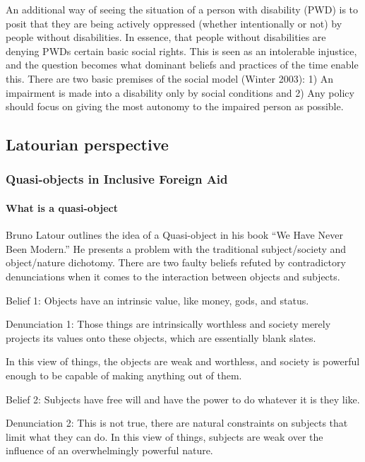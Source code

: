 \documentclass[a4paper]{article}
\begin{document}
An additional way of seeing the situation of a person with disability (PWD) is
to posit that they are being actively oppressed (whether intentionally or not)
by people without disabilities. In essence, that people without disabilities
are denying PWDs certain basic social rights. This is seen as an intolerable
injustice, and the question becomes what dominant beliefs and practices of the
time enable this. There are two basic premises of the social model (Winter
2003): 1) An impairment is made into a disability only by social conditions
and 2) Any policy should focus on giving the most autonomy to the impaired
person as possible.  



\subsection{Latourian perspective}


\subsubsection{Quasi-objects in Inclusive Foreign Aid}

\paragraph{What is a quasi-object}

Bruno Latour outlines the idea of a Quasi-object in his book ``We Have Never
Been Modern.'' He presents a problem with the traditional subject/society and
object/nature dichotomy. There are two faulty beliefs refuted by contradictory
denunciations when it comes to the interaction between objects and subjects. 

Belief 1: Objects have an intrinsic value, like money, gods, and status. 

Denunciation 1: Those things are intrinsically worthless and society merely
projects its values onto these objects, which are essentially blank slates.

In this view of things, the objects are weak and worthless, and society is
powerful enough to be capable of making anything out of them.

Belief 2: Subjects have free will and have the power to do whatever it is they
like.

Denunciation 2: This is not true, there are natural constraints on subjects
that limit what they can do.  In this view of things, subjects are weak over
the influence of an overwhelmingly powerful nature.
\end{document}
